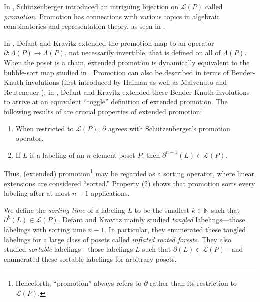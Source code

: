 \documentclass[11pt]{amsart}
\theoremstyle{definition}
\newcommand{\N}{\mathbb{N}}
\newcommand{\call}{\mathcal{L}}
\begin{document}
In \cite{MR190017,MR299539,MR0476842}, Sch\"{u}tzenberger introduced an intriguing bijection on $ \call(P) $ called \emph{promotion}. Promotion has connections with various topics in algebraic combinatorics and representation theory, as seen in \cite{MR871081,MR3983097,MR2519848,MR2557880,MR2515772}. 

In \cite{DK20}, Defant and Kravitz extended the promotion map to an operator $ \partial:\Lambda(P)\to\Lambda(P) $, not necessarily invertible, that is defined on all of $ \Lambda(P) $. When the poset is a chain, extended promotion is dynamically equivalent to the bubble-sort map studied in \cite{Knuth1973}. Promotion can also be described in terms of Bender-Knuth involutions (first introduced by Haiman \cite{MR1158783} as well as Malvenuto and Reutenauer \cite{MR1297379}); in \cite{DK20}, Defant and Kravitz extended these Bender-Knuth involutions to arrive at an equivalent ``toggle'' definition of extended promotion. The following results of \cite{DK20} are crucial properties of extended promotion: \begin{enumerate}
	\item When restricted to $ \call(P) $, $ \partial $ agrees with Sch\"{u}tzenberger's promotion operator. 
	\item If $ L $ is a labeling of an $ n $-element poset $ P $, then $ \partial^{n-1}(L)\in\call(P) $. 
\end{enumerate} Thus, (extended) promotion\footnote{Henceforth, ``promotion'' always refers to $ \partial $ rather than its restriction to $ \call(P) $.} may be regarded as a sorting operator, where linear extensions are considered ``sorted.'' Property (2) shows that promotion sorts every labeling after at most $ n-1 $ applications.

We define the \emph{sorting time} of a labeling $ L $ to be the smallest $ k\in\N $ such that $ \partial^k(L)\in\call(P) $. Defant and Kravitz mainly studied \emph{tangled} labelings---those labelings with sorting time $ n-1 $. In particular, they enumerated these tangled labelings for a large class of posets called \emph{inflated rooted forests}. They also studied \emph{sortable} labelings---those labelings $ L $ such that $ \partial(L)\in\call(P) $---and enumerated these sortable labelings for arbitrary posets.
\end{document}
